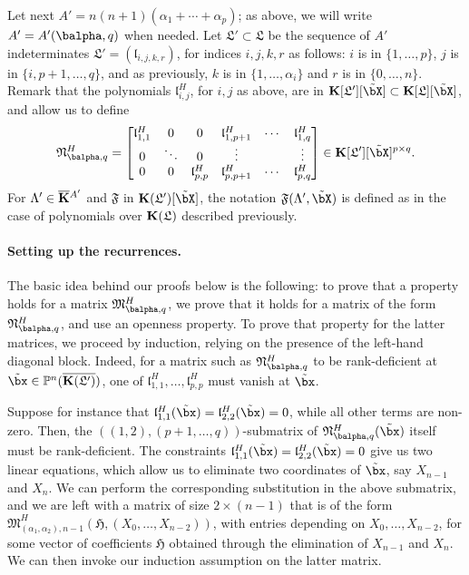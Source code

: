 \documentclass[12pt]{article}
\begin{document}
Let next $A'=n(n+1)(\alpha_1+\cdots+\alpha_p)$; as above, 
we will write $A'=A'(\balpha,q)$ when needed. Let
$\mathfrak{L}'\subset \mathfrak{L}$ be the sequence of $A'$
indeterminates $\mathfrak{L}'=(\mathfrak{l}_{i,j,k,r})$, for indices
$i,j,k,r$ as follows: $i$ is in $\{1,\dots,p\}$, $j$ is in
$\{i,p+1,\dots,q\}$, and as previously, $k$ is in
$\{1,\dots,\alpha_i\}$ and $r$ is in $\{0,\dots,n\}$. Remark that the
polynomials $\mathfrak{l}^H_{i,j}$, for $i,j$ as above, are in
$\KK[\mathfrak{L}'][\tilde\bX] \subset \KK[\mathfrak{L}][\tilde \bX]$,
and allow us to define
\begin{align}\label{eq:matMprime}
\mathfrak{N}^H_{\balpha,q}=\left [\begin{matrix} \mathfrak{l}^H_{1,1} & 0 & 0
    &\mathfrak{l}^H_{1,p+1} & \cdots & \mathfrak{l}^H_{1,q}\\ 0 & \ddots &
    0 & \vdots & & \vdots\\ 0&0& \mathfrak{l}^H_{p,p}
    &\mathfrak{l}^H_{p,p+1} & \cdots & \mathfrak{l}^H_{p,q}
  \end{matrix}\right ]\in \KK[\mathfrak{L}'][\tilde\bX]^{p\times q}.
\end{align}
For $\Lambda' \in \overline{\mathbf{K}}{}^{A'}$ and $\mathfrak{F}$ in 
$\KK(\mathfrak{L}')[\tilde\bX]$, the notation
$\mathfrak{F}(\Lambda',\tilde\bX)$ is defined as in the case of
polynomials over $\mathbf{K}(\mathfrak{L})$ described previously.


\paragraph{Setting up the recurrences.}
The basic idea behind our proofs below is the following: to prove that
a property holds for a matrix $\mathfrak{M}^H_{\balpha,q}$, we prove
that it holds for a matrix of the form $\mathfrak{N}^H_{\balpha,q}$,
and use an openness property. To prove that property for the
latter matrices, we proceed by induction, relying on the presence of
the left-hand diagonal block. Indeed, for a matrix such as
$\mathfrak{N}^H_{\balpha,q}$ to be rank-deficient at $\tilde\bx \in
\P^n(\KKGpbar)$, one of
$\mathfrak{l}^H_{1,1},\dots,\mathfrak{l}^H_{p,p}$ must vanish at
$\tilde\bx$.

Suppose for instance that
$\mathfrak{l}^H_{1,1}(\tilde\bx)=\mathfrak{l}^H_{2,2}(\tilde\bx)=0$,
while all other terms are non-zero. Then, the
$((1,2),(p+1,\dots,q))$-submatrix of
${\mathfrak{N}^H_{\balpha,q}}(\tilde\bx)$ itself must be
rank-deficient.  The constraints
$\mathfrak{l}^H_{1,1}(\tilde\bx)=\mathfrak{l}^H_{2,2}(\tilde\bx)=0$
give us two linear equations, which allow us to eliminate two
coordinates of $\tilde\bx$, say $X_{n-1}$ and $X_n$. We can perform
the corresponding substitution in the above submatrix, and we are left
with a matrix of size $2 \times (n-1)$ that is of the form
$\mathfrak{M}^H_{(\alpha_1,\alpha_2),n-1}(\mathfrak{H},(X_0,\dots,X_{n-2}))$,
with entries depending on $X_0,\dots,X_{n-2}$, for some vector of
coefficients $\mathfrak{H}$ obtained through the elimination of
$X_{n-1}$ and $X_n$. We can then invoke our induction assumption on
the latter matrix.
\end{document}
